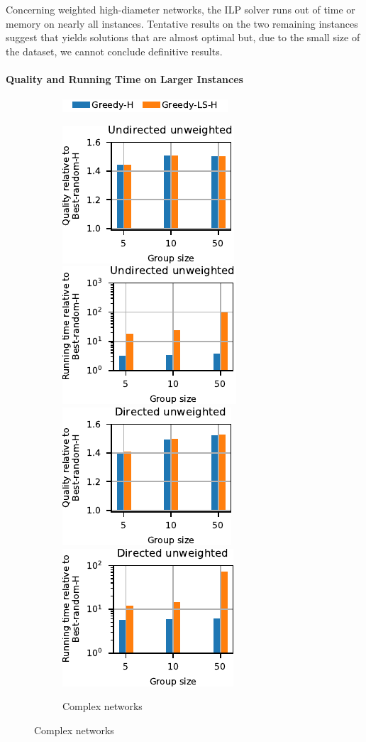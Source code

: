 Concerning weighted high-diameter networks, the ILP solver runs
out of time or memory on nearly all instances. Tentative results
on the two remaining instances suggest that \greedyh yields solutions
that are almost optimal but, due to the small size of the dataset,
we cannot conclude definitive results.

\paragraph{Quality and Running Time on Larger Instances}
%
\begin{figure}[tb]
\begin{subfigure}[t]{\textwidth}
\centering
\includegraphics{./sources/plots/gh-gc-apx/legend-large-harmonic.pdf}
\end{subfigure}\medskip

\begin{subfigure}[t]{\textwidth}
\centering
\includegraphics[width=.24\textwidth]{./sources/plots/gh-gc-apx/quality-harmonic-small-diameter-undirected-unweighted.pdf}
\includegraphics[width=.24\textwidth]{./sources/plots/gh-gc-apx/time-harmonic-small-diameter-undirected-unweighted.pdf}
\includegraphics[width=.24\textwidth]{./sources/plots/gh-gc-apx/quality-harmonic-small-diameter-directed-unweighted.pdf}
\includegraphics[width=.24\textwidth]{./sources/plots/gh-gc-apx/time-harmonic-small-diameter-directed-unweighted.pdf}
\caption{Complex networks}
\label{fig:gh-gc-apx:qual-time-gh-cplx}
\end{subfigure}\medskip


\end{figure}
